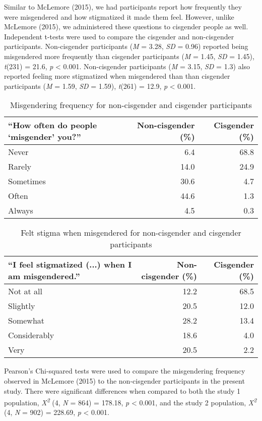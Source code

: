 \documentclass[12pt,twoside]{reedthesis}
\begin{document}
Similar to McLemore (2015), we had participants report how frequently they were misgendered and how stigmatized it made them feel. However, unlike McLemore (2015), we administered these questions to cisgender people as well. Independent t-tests were used to compare the cisgender and non-cisgender participants. Non-cisgender participants (\emph{M} = 3.28, \emph{SD} = 0.96) reported being misgendered more frequently than cisgender participants (\emph{M} = 1.45, \emph{SD} = 1.45), \emph{t}(231) = 21.6, \emph{p} \textless{} 0.001.
Non-cisgender participants (\emph{M} = 3.15, \emph{SD} = 1.3) also reported feeling more stigmatized when misgendered than than cisgender participants (\emph{M} = 1.59, \emph{SD} = 1.59), \emph{t}(261) = 12.9, \emph{p} \textless{} 0.001.
\begin{longtable}[t]{lrr}
\caption{\label{tab:unnamed-chunk-5}Misgendering frequency for non-cisgender and cisgender participants}\\
\toprule
“How often do people ‘misgender’ you?” & Non-cisgender (\%) & Cisgender (\%)\\
\midrule
Never & 6.4 & 68.8\\
Rarely & 14.0 & 24.9\\
Sometimes & 30.6 & 4.7\\
Often & 44.6 & 1.3\\
Always & 4.5 & 0.3\\
\bottomrule
\end{longtable}
\begin{longtable}[t]{lrr}
\caption{\label{tab:unnamed-chunk-6}Felt stigma when misgendered for non-cisgender and cisgender participants}\\
\toprule
“I feel stigmatized (...) when I am misgendered.” & Non-cisgender (\%) & Cisgender (\%)\\
\midrule
Not at all & 12.2 & 68.5\\
Slightly & 20.5 & 12.0\\
Somewhat & 28.2 & 13.4\\
Considerably & 18.6 & 4.0\\
Very & 20.5 & 2.2\\
\bottomrule
\end{longtable}
Pearson's Chi-squared tests were used to compare the misgendering frequency observed in McLemore (2015) to the non-cisgender participants in the present study.
There were significant differences when compared to both the study 1 population, \emph{X\textsuperscript{2}} (4, \emph{N} = 864) = 178.18, \emph{p} \textless{} 0.001, and the study 2 population, \emph{X\textsuperscript{2}} (4, \emph{N} = 902) = 228.69, \emph{p} \textless{} 0.001.
\end{document}
